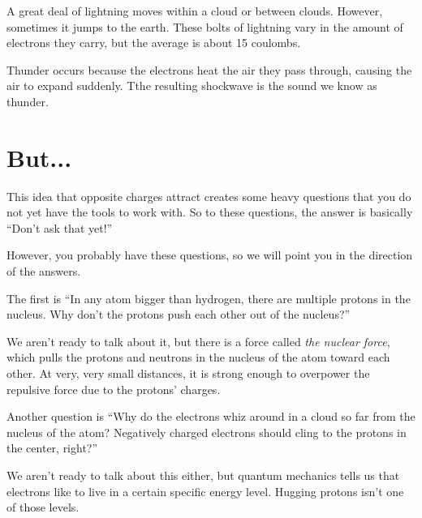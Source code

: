 A great deal of lightning moves within a cloud or between clouds. However, sometimes it jumps to the earth. These bolts of lightning vary in the amount of
electrons they carry, but the average is about 15 coulombs.

Thunder occurs because the electrons heat the air they pass through, 
causing the air to expand suddenly. Tthe resulting shockwave is the sound we know as thunder.
\section{But...}

This idea that opposite charges attract creates some heavy questions
that you do not yet have the tools to work with. So to these questions, the answer is
basically ``Don't ask that yet!''

However, you probably have these questions, so we will point you in
the direction of the answers.

The first is ``In any atom bigger than hydrogen, there are multiple
protons in the nucleus. Why don't the protons push each other out of
the nucleus?''

We aren't ready to talk about it, but there is a force called \textit{the
 nuclear force}, which pulls the protons and neutrons in the nucleus
of the atom toward each other. At very, very small distances, it is
strong enough to overpower the repulsive force due to the protons'
charges.

Another question is ``Why do the electrons whiz around in a cloud so
far from the nucleus of the atom? Negatively charged electrons should
cling to the protons in the center, right?''

We aren't ready to talk about this either, but quantum mechanics tells us that
electrons like to live in a certain specific energy level. Hugging
protons isn't one of those levels.



